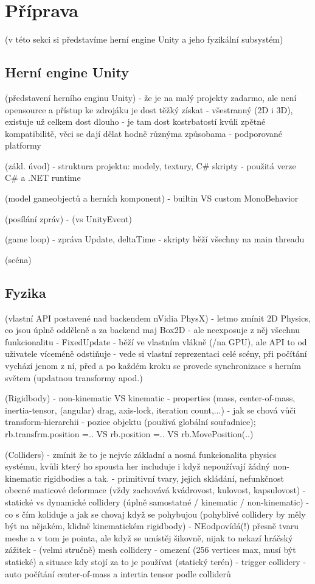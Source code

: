 \chapter{Příprava}
(v této sekci si představíme herní engine Unity a jeho fyzikální subsystém)

\section{Herní engine Unity}

(představení herního enginu Unity)
- že je na malý projekty zadarmo, ale není opensource a přístup ke zdrojáku je dost těžký získat
- všestranný (2D i 3D), existuje už celkem dost dlouho - je tam dost kostrbatostí kvůli zpětné kompatibilitě, věci se dají dělat hodně různýma způsobama
- podporované platformy

(zákl. úvod)
- struktura projektu: modely, textury, C\# skripty
- použitá verze C\# a .NET runtime

(model gameobjectů a herních komponent)
- builtin VS custom MonoBehavior

(posílání zpráv)
- (vs UnityEvent)

(game loop)
- zpráva Update, deltaTime
- skripty běží všechny na main threadu

(scéna)



\section{Fyzika}

(vlastní API postavené nad backendem nVidia PhysX)
- letmo zmínit 2D Physics, co jsou úplně odděleně a za backend maj Box2D 
- ale neexposuje z něj všechnu funkcionalitu
- FixedUpdate
- běží ve vlastním vlákně (/na GPU), ale API to od uživatele víceméně odstiňuje
- vede si vlastní reprezentaci celé scény, při počítání vychází jenom z ní, před a po každém kroku se provede synchronizace s herním světem (updatnou transformy apod.)

(Rigidbody)
- non-kinematic VS kinematic
- properties (mass, center-of-mass, inertia-tensor, (angular) drag, axis-lock, iteration count,...)
- jak se chová vůči transform-hierarchii
- pozice objektu (používá globální souřadnice); rb.transfrm.position =.. VS rb.position =.. VS rb.MovePosition(..)

(Colliders)
- zmínit že to je nejvíc základní a nosná funkcionalita physics systému, kvůli který ho spousta her includuje i když nepoužívají žádný non-kinematic rigidbodies a tak.  
- primitivní tvary, jejich skládání, nefunkčnost obecné maticové deformace (vždy zachovává kvádrovost, kulovost, kapsulovost)
- statické vs dynamické collidery (úplně samostatné / kinematic / non-kinematic) - co s čím koliduje a jak se chovaj když se pohybujou (pohyblivé collidery by měly být na nějakém, klidně kinematickém rigidbody)
- NEodpovídá(!) přesně tvaru meshe a v tom je pointa, ale když se umístěj šikovně, nijak to nekazí hráčský zážitek
- (velmi stručně) mesh collidery - omezení (256 vertices max, musí být statické) a situace kdy stojí za to je používat (statický terén)
- trigger collidery
- auto počítání center-of-mass a intertia tensor podle colliderů

